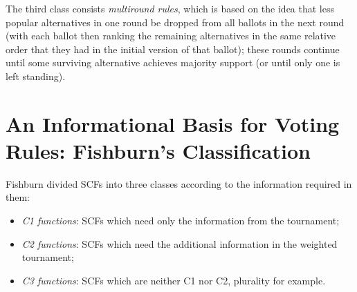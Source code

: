 \label{run-off}
The third class consists \textit{multiround rules}, which is based on the idea that less popular alternatives in one round be dropped from all ballots in the next round (with each ballot then ranking the remaining alternatives in the same relative order that they had in the initial version of that ballot); these rounds continue until some surviving alternative achieves majority support (or until only one is left standing).

\section{An Informational Basis for Voting Rules: Fishburn's Classification}

Fishburn divided SCFs into three classes according to the information required in them:
\begin{itemize}
    \item \textit{C1 functions}: SCFs which need only the information from the tournament;
    \item \textit{C2 functions}: SCFs which need the additional information in the weighted tournament;
    \item \textit{C3 functions}: SCFs which are neither C1 nor C2, plurality for example.
\end{itemize}